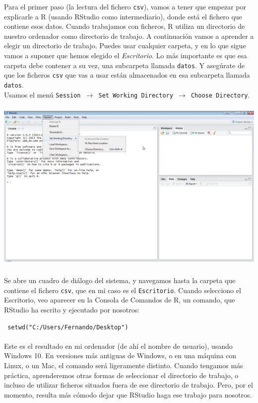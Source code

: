 \documentclass[10pt,a4paper]{article}\usepackage[]{graphicx}\usepackage[]{color}
\newcounter {cont01}
\begin{document}
Para el primer paso (la lectura del fichero {\tt csv}), vamos a tener que empezar por explicarle a R (usando RStudio como intermediario), donde está el fichero que contiene esos datos. Cuando trabajamos con ficheros, R utiliza un directorio de nuestro ordenador como {\sf directorio de trabajo}. A continuación vamos a aprender a elegir un directorio de trabajo. Puedes usar cualquier carpeta, y en lo que sigue vamos a suponer que hemos elegido el {\em Escritorio}. Lo más importante es que esa carpeta debe contener a su vez, una subcarpeta llamada {\tt datos}. Y asegúrate de que los ficheros {\tt csv} que vas a usar están almacenados en esa subcarpeta llamada {\tt datos}.\\

Usamos el menú {\tt Session $\to$ Set Working Directory $\to$ Choose Directory}.
    \begin{center}
    \includegraphics[height=8.5cm]{../fig/Tut03-18.png}
    \end{center}
Se abre un cuadro de diálogo del sistema, y navegamos hasta la carpeta que contiene el fichero {\tt csv}, que en mi caso es el {\tt Escritorio}. Cuando selecciono el Escritorio, veo aparecer en la Consola de Comandos de R, un comando, que RStudio ha escrito y ejecutado por nosotros:

\begin{center}
\verb# setwd("C:/Users/Fernando/Desktop") #
\end{center}
\paragraph*{}\label{tut02:lugar:ComandoSetwd}Este es el resultado en mi ordenador (de ahí el nombre de usuario), usando Windows 10. En versiones más antiguas de Windows, o en una máquina con Linux, o un Mac, el comando será ligeramente distinto. Cuando tengamos más práctica, aprenderemos otras formas de seleccionar el directorio de trabajo, o incluso de utilizar ficheros situados fuera de ese directorio de trabajo. Pero, por el momento, resulta más cómodo dejar que \mbox{RStudio} haga ese trabajo para nosotros.
\end{document}
